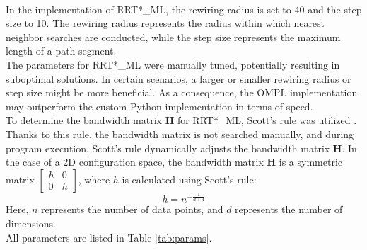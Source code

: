 \documentclass{ctuthesis}
\begin{document}
\\
In the implementation of RRT*\_ML, 
the rewiring radius is set to 40 and the step size to 10. 
The rewiring radius represents the radius within which nearest neighbor 
searches are conducted, 
while the step size represents the maximum length of a path segment.
\\[12pt]
The parameters for RRT*\_ML were manually tuned, 
potentially resulting in suboptimal solutions. 
In certain scenarios, a larger or smaller rewiring radius or step size might be more beneficial. 
As a consequence, 
the OMPL implementation may outperform the custom Python implementation in terms of speed. 
\\[12pt]
To determine the bandwidth matrix $\mathbf{H}$ for RRT*\_ML, 
Scott's rule was utilized \cite{Scott1992MultivariateDE}. 
Thanks to this rule, the bandwidth matrix is not searched manually, 
and during program execution, Scott's rule dynamically adjusts 
the bandwidth matrix $\mathbf{H}$. 
In the case of a 2D configuration space, 
the bandwidth matrix $\mathbf{H}$ is a symmetric 
matrix $\left[ \begin{array}{cc} h & 0 \\ 0 & h \end{array} \right]$, 
where $h$ is calculated using Scott's rule:
\[ h = n^{-\frac{1}{d+4}} \]
Here, $n$ represents the number of data points, and $d$ represents the number of dimensions.
\\[12pt]
All parameters are listed in Table \ref{tab:params}.
\end{document}
